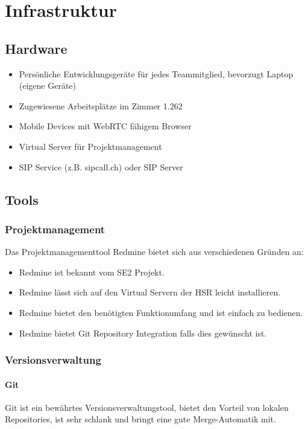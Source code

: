 \chapter{Infrastruktur}

\section{Hardware}
\begin{itemize}
	\setlength{\itemsep}{-\parsep}
	\item Persönliche Entwicklungsgeräte für jedes Teammitglied, bevorzugt Laptop (eigene Geräte)
	\item Zugewiesene Arbeitsplätze im Zimmer 1.262
	\item Mobile Devices mit WebRTC fähigem Browser
	\item Virtual Server für Projektmanagement
	\item SIP Service (z.B. sipcall.ch) oder SIP Server
\end{itemize}

\section{Tools}
\subsection{Projektmanagement}
Das Projektmanagementtool Redmine bietet sich aus verschiedenen Gründen an:
\begin{itemize}
	\setlength{\itemsep}{-\parsep}
	\item Redmine ist bekannt vom SE2 Projekt.
	\item Redmine lässt sich auf den Virtual Servern der HSR leicht installieren.
	\item Redmine bietet den benötigten Funktionumfang und ist einfach zu bedienen.
	\item Redmine bietet Git Repository Integration falls dies gewünscht ist.
\end{itemize}


\subsection{Versionsverwaltung}
\subsubsection{Git}
Git ist ein bewährtes Versionsverwaltungstool, bietet den Vorteil von lokalen Repositories, ist sehr schlank und bringt eine gute Merge-Automatik mit.

